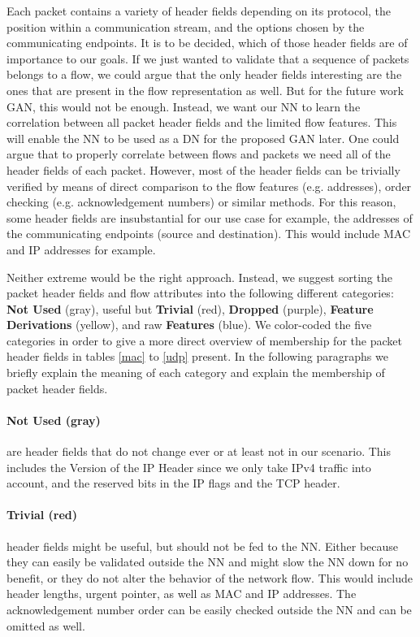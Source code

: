\documentclass[
	ngerman,
	ruledheaders=section,%
	class=report,%
	thesis={type=bachelor},%
	accentcolor=9c,%
	custommargins=true,%
	marginpar=false,%
	parskip=half-,%
	fontsize=11pt,%
]{tudapub}
\begin{document}
Each packet contains a variety of header fields depending on its protocol, the position within a communication stream, and the options chosen by the communicating endpoints.
It is to be decided, which of those header fields are of importance to our goals.
If we just wanted to validate that a sequence of packets belongs to a flow, we could argue that the only header fields interesting are the ones that are present in the flow representation as well.
But for the future work GAN, this would not be enough.
Instead, we want our NN to learn the correlation between all packet header fields and the limited flow features.
This will enable the NN to be used as a DN for the proposed GAN later.
One could argue that to properly correlate between flows and packets we need all of the header fields of each packet.
However, most of the header fields can be trivially verified by means of direct comparison to the flow features (e.g. addresses), order checking (e.g. acknowledgement numbers) or similar methods.
For this reason, some header fields are insubstantial for our use case for example, the addresses of the communicating endpoints (source and destination).
This would include MAC and IP addresses for example.

Neither extreme would be the right approach.
Instead, we suggest sorting the packet header fields and flow attributes into the following different categories:
\colorbox{not}{\textbf{{Not Used}} (gray)},
useful but \colorbox{trivial}{\textbf{Trivial} (red)},
\colorbox{dropped}{\textbf{Dropped} (purple)},
\colorbox{derivation}{\textbf{Feature Derivations} (yellow)},
and raw \colorbox{feature}{\textbf{Features} (blue)}.
We color-coded the five categories in order to give a more direct overview of membership for the packet header fields in tables \ref{mac} to \ref{udp} present.
In the following paragraphs we briefly explain the meaning of each category and explain the membership of packet header fields.

\paragraph{\colorbox{not}{\textbf{{Not Used} (gray)}}} are header fields that do not change ever or at least not in our scenario.
This includes the Version of the IP Header since we only take IPv4 traffic into account,
and the reserved bits in the IP flags and the TCP header.

\paragraph{\colorbox{trivial}{\textbf{Trivial} (red)}} header fields might be useful, but should not be fed to the NN.
Either because they can easily be validated outside the NN and might slow the NN down for no benefit,
or they do not alter the behavior of the network flow.
This would include header lengths, urgent pointer, as well as MAC and IP addresses.
The acknowledgement number order can be easily checked outside the NN and can be omitted as well.
\end{document}
